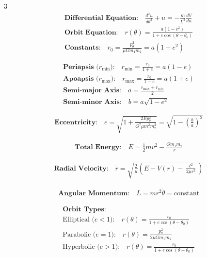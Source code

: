 \documentclass[1pt]{article}
\begin{document}
\begin{multicols}{3}
\begin{align*}
    &\textbf{Differential Equation:} \quad \frac{d^2u}{d\theta^2} + u = -\frac{m}{L^2} \frac{dV}{du} \\
    &\textbf{Orbit Equation:} \quad r(\theta) = \frac{a(1 - e^2)}{1 + e\cos(\theta - \theta_0)} \\
    &\textbf{Constants:} \quad r_0 = \frac{p_\theta^2}{\mu G m_1 m_2} = a(1 - e^2)
\end{align*}

\begin{align*}
    &\textbf{Periapsis (} r_{\min} \textbf{):} \quad r_{\min} = \frac{r_0}{1 + e} = a(1 - e) \\
    &\textbf{Apoapsis (} r_{\max} \textbf{):} \quad r_{\max} = \frac{r_0}{1 - e} = a(1 + e) \\
    &\textbf{Semi-major Axis:} \quad a = \frac{r_{\max} + r_{\min}}{2} \\
    &\textbf{Semi-minor Axis:} \quad b = a\sqrt{1 - e^2}
\end{align*}

\begin{align*}
    &\textbf{Eccentricity:} \quad e = \sqrt{1 + \frac{2E p_\theta^2}{G^2 \mu m_1^2 m_2^2}} = \sqrt{1 - \left(\frac{b}{a}\right)^2}
\end{align*}

\begin{align*}
    &\textbf{Total Energy:} \quad E = \frac{1}{2} m v^2 - \frac{G m_1 m_2}{r}
\end{align*}

\begin{align*}
    &\textbf{Radial Velocity:} \quad \dot{r} = \sqrt{\frac{2}{\mu} \left( E - V(r) - \frac{\ell^2}{2\mu r^2} \right)}
\end{align*}

\begin{align*}
    &\textbf{Angular Momentum:} \quad L = m r^2 \dot{\theta} = \text{constant}
\end{align*}

\begin{align*}
    &\textbf{Orbit Types:} \\
    &\text{Elliptical (} e < 1\text{):} \quad r(\theta) = \frac{r_0}{1 + e \cos(\theta - \theta_0)} \\
    &\text{Parabolic (} e = 1\text{):} \quad r(\theta) = \frac{p_\theta^2}{2\mu G m_1 m_2} \\
    &\text{Hyperbolic (} e > 1\text{):} \quad r(\theta) = \frac{r_0}{1 + e \cos(\theta - \theta_0)}
\end{align*}


\end{multicols}
\end{document}
